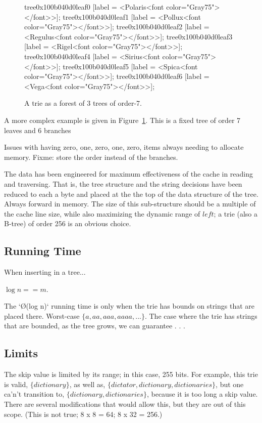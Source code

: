 \documentclass[12pt]{article}
\begin{document}
\begin{figure}
{{	tree0x100b040d0leaf0 [label = <Polaris<font color="Gray75"></font>>];
	tree0x100b040d0leaf1 [label = <Pollux<font color="Gray75"></font>>];
	tree0x100b040d0leaf2 [label = <Regulus<font color="Gray75"></font>>];
	tree0x100b040d0leaf3 [label = <Rigel<font color="Gray75"></font>>];
	tree0x100b040d0leaf4 [label = <Sirius<font color="Gray75"></font>>];
	tree0x100b040d0leaf5 [label = <Spica<font color="Gray75"></font>>];
	tree0x100b040d0leaf6 [label = <Vega<font color="Gray75"></font>>];
}
	}
	\caption{A trie as a forest of 3 trees of order-7.\label{star-1}}
\end{figure}

A more complex example is given in Figure~\ref{star-1}. This is a fixed tree of order 7 leaves and 6 branches

Issues with having zero, one, zero, one, zero, items always needing to allocate memory. Fixme: store the order instead of the branches.

The data has been engineered for maximum effectiveness of the cache in reading and traversing. That is, the tree structure and the string decisions have been reduced to each a byte and placed at the the top of the data structure of the tree. Always forward in memory. The size of this sub-structure should be a multiple of the cache line size, while also maximizing the dynamic range of $\mathit{left}$; a trie (also a B-tree) of order 256 is an obvious choice.\cite{sinha2004cache}

\subsection{Running Time}

When inserting in a tree...

\cite{shannon1948mathematical} $\log n == m$.

The `\O(log n)` running time is only when the trie has bounds on strings that are placed there. Worst-case $\{ a, aa, aaa, aaaa, ... \}$. The case where the trie has strings that are bounded, as the tree grows, we can guarantee . . .

\subsection{Limits}

The skip value is limited by its range; in this case, 255 bits. For example, this trie is valid, $\{ dictionary \}$, as well as, $\{ dictator, dictionary, dictionaries \}$, but one ca'n't transition to, $\{ dictionary, dictionaries \}$, because it is too long a skip value. There are several modifications that would allow this, but they are out of this scope. (This is not true; 8 x 8 = 64; 8 x 32 = 256.)
\end{document}
